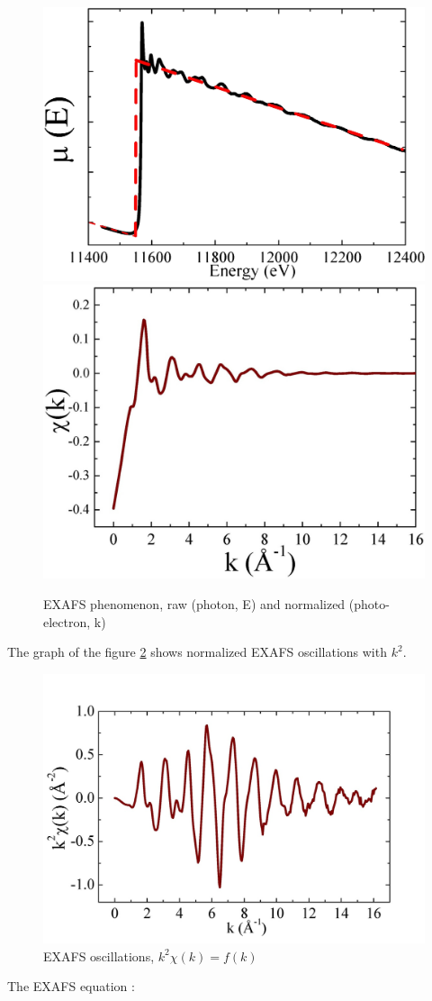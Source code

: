 \documentclass[11pt,a4paper,oneside]{report}
\begin{document}
\begin{figure}[H]
    \begin{center}
        \includegraphics[height=0.35\textwidth]{Images/EXAFS2}
        \includegraphics[height=0.35\textwidth]{Images/relativeEXAFS}
        \caption{EXAFS phenomenon, raw (photon, E) and normalized (photo-electron, k)}
        \label{exafsgraph}
    \end{center}
\end{figure}

The graph of the figure \ref{exafsgraphtimesksquare} shows normalized EXAFS oscillations with $k^2$.

\begin{figure}[H]
    \begin{center}
        \includegraphics[height=0.35\textwidth]{Images/EXAFS3}
        \caption{EXAFS oscillations, $k^2\chi(k) = f (k)$}
        \label{exafsgraphtimesksquare}
    \end{center}
\end{figure}

The EXAFS equation :
\[  
\]
\end{document}
